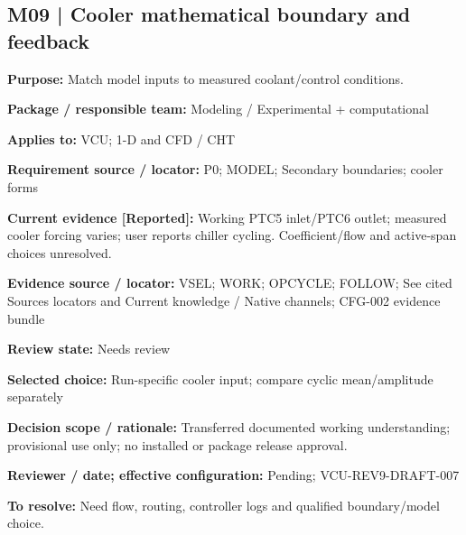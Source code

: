 \documentclass[11pt]{article}
\begin{document}
\par\noindent\begin{minipage}{\textwidth}\small\setlength{\parskip}{2pt}
\subsection*{M09 | Cooler mathematical boundary and feedback}
\textbf{Purpose:} Match model inputs to measured coolant/control conditions.\par
\textbf{Package / responsible team:} Modeling / Experimental + computational\par
\textbf{Applies to:} VCU; 1-D and CFD / CHT\par
\textbf{Requirement source / locator:} P0; MODEL; Secondary boundaries; cooler forms\par
\textbf{Current evidence [Reported]:} Working PTC5 inlet/PTC6 outlet; measured cooler forcing varies; user reports chiller cycling. Coefficient/flow and active-span choices unresolved.\par
\textbf{Evidence source / locator:} VSEL; WORK; OPCYCLE; FOLLOW; See cited Sources locators and Current knowledge / Native channels; CFG-002 evidence bundle\par
\textbf{Review state:} Needs review\par
\textbf{Selected choice:} Run-specific cooler input; compare cyclic mean/amplitude separately\par
\textbf{Decision scope / rationale:} Transferred documented working understanding; provisional use only; no installed or package release approval.\par
\textbf{Reviewer / date; effective configuration:} Pending; VCU-REV9-DRAFT-007\par
\textbf{To resolve:} Need flow, routing, controller logs and qualified boundary/model choice.\par
\end{minipage}\par\vspace{5pt}
\end{document}
